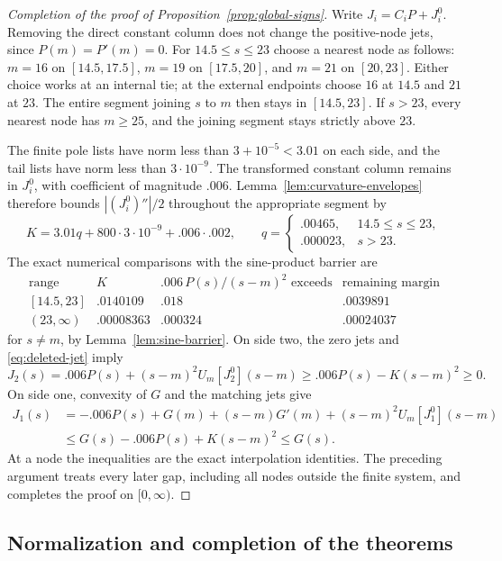 \documentclass[11pt]{article}
\theoremstyle{remark}\newtheorem{remark}[theorem]{Remark}
\begin{document}
\begin{proof}[Completion of the proof of Proposition~\ref{prop:global-signs}]
Write $J_i=C_iP+J_i^0$.  Removing the direct constant column
does not change the positive-node jets, since $P(m)=P'(m)=0$.
For $14.5\le s\le23$ choose a nearest node as follows:
$m=16$ on $[14.5,17.5]$, $m=19$ on $[17.5,20]$, and
$m=21$ on $[20,23]$.  Either choice works at an internal tie;
at the external endpoints choose $16$ at $14.5$ and $21$ at
$23$.  The entire segment joining $s$ to $m$ then stays in
$[14.5,23]$.  If $s>23$, every nearest node has $m\ge25$,
and the joining segment stays strictly above $23$.

The finite pole lists have norm less than $3+10^{-5}<3.01$
on each side, and the tail lists have norm less than $3\cdot10^{-9}$.
The transformed constant column remains in $J_i^0$, with coefficient
of magnitude $.006$.  Lemma~\ref{lem:curvature-envelopes} therefore
bounds $|(J_i^0)''|/2$ throughout the appropriate segment by
\[
 K=3.01q+800\cdot3\cdot10^{-9}+.006\cdot.002,
 \qquad
 q=\begin{cases}.00465,&14.5\le s\le23,\\
                  .000023,&s>23.
    \end{cases}
\]
The exact numerical comparisons with the sine-product barrier are
\[
\begin{array}{c|c|c|c}
\text{range}&K&.006\,P(s)/(s-m)^2\text{ exceeds}&
             \text{remaining margin}\\\hline
[14.5,23]&.0140109&.018&.0039891\\
(23,\infty)&.00008363&.000324&.00024037
\end{array}
\]
for $s\ne m$, by Lemma~\ref{lem:sine-barrier}.
On side two, the zero jets and \eqref{eq:deleted-jet} imply
\[
 J_2(s)=.006P(s)+(s-m)^2U_m[J_2^0](s-m)
          \ge .006P(s)-K(s-m)^2\ge0.
\]
On side one, convexity of $G$ and the matching jets give
\[
\begin{split}
 J_1(s)&=-.006P(s)+G(m)+(s-m)G'(m)
                     +(s-m)^2U_m[J_1^0](s-m)\\
       &\le G(s)-.006P(s)+K(s-m)^2\le G(s).
\end{split}
\]
At a node the inequalities are the exact interpolation identities.
The preceding argument treats every later gap, including all nodes
outside the finite system, and completes the proof on $[0,\infty)$.
\end{proof}

\subsection{Normalization and completion of the theorems}
\end{document}
